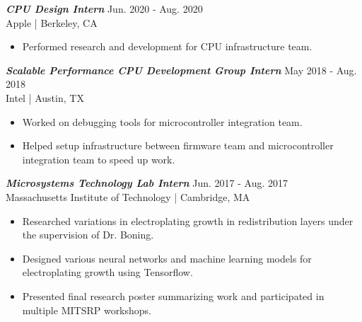 \documentclass[letter]{res}
\begin{document}
\begin{resume}
\vspace{-2mm}

{\sl \textbf{CPU Design Intern}} \hfill Jun. 2020 - Aug. 2020\\
Apple | Berkeley, CA \newline

 \vspace{-4mm}

 \begin{itemize}
 \item Performed research and development for CPU infrastructure team.
 \end{itemize}

\vspace{-2mm}

{\sl \textbf{Scalable Performance CPU Development Group Intern}} \hfill May 2018 - Aug. 2018\\
Intel | Austin, TX \newline

 \vspace{-4mm}

 \begin{itemize}
 \item Worked on debugging tools for microcontroller integration team.
 \item Helped setup infrastructure between firmware team and microcontroller integration team to speed up work.
 \end{itemize}

\vspace{-2mm}

{\sl \textbf{Microsystems Technology Lab Intern}} \hfill Jun. 2017 - Aug. 2017\\
Massachusetts Institute of Technology | Cambridge, MA \newline

 \vspace{-4mm}

 \begin{itemize}
 \item Researched variations in electroplating growth in redistribution layers under the supervision of Dr. Boning.
 \item Designed various neural networks and machine learning models for electroplating growth using Tensorflow.
 \item Presented final research poster summarizing work and participated in multiple MITSRP workshops.
 \end{itemize}

\vspace{-2mm}


\end{resume}
\end{document}
